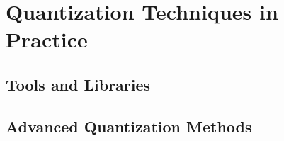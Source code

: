 \section{Quantization Techniques in Practice}


\subsection{Tools and Libraries}

\subsection{Advanced Quantization Methods}

